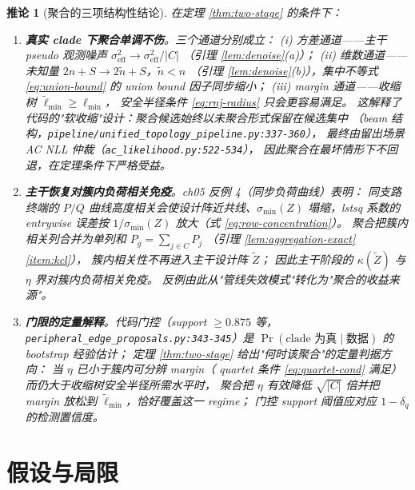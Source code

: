 \documentclass[UTF8,11pt]{ctexart}
\newtheorem{corollary}{推论}
\begin{document}
\begin{corollary}[聚合的三项结构性结论]
\label{cor:main}
在定理 \ref{thm:two-stage} 的条件下：
\begin{enumerate}[label=\textup{(\roman*)},leftmargin=2.6em]
  \item \textbf{真实 clade 下聚合单调不伤}。三个通道分别成立：
        (i) 方差通道——主干 pseudo 观测噪声 $\sigma_{\mathrm{eff}}^2\to\sigma_{\mathrm{eff}}^2/|C|$
        （引理 \ref{lem:denoise}(a)）；
        (ii) 维数通道——未知量 $2n+S\to 2\tilde n+S$，$\tilde n<n$
        （引理 \ref{lem:denoise}(b)），集中不等式 \eqref{eq:union-bound} 的
        union bound 因子同步缩小；
        (iii) margin 通道——收缩树 $\widetilde\ell_{\min}\ge\ell_{\min}$，
        安全半径条件 \eqref{eq:rnj-radius} 只会更容易满足。
        这解释了代码的"软收缩"设计：聚合候选始终以未聚合形式保留在候选集中
        （beam 结构，\texttt{pipeline/unified\_topology\_pipeline.py:337-360}），
        最终由留出场景 AC NLL 仲裁（\texttt{ac\_likelihood.py:522-534}），
        因此聚合在最坏情形下不回退，在定理条件下严格受益。
  \item \textbf{主干恢复对簇内负荷相关免疫}。ch05 反例 4（同步负荷曲线）表明：
        同支路终端的 $P/Q$ 曲线高度相关会使设计阵近共线、$\sigma_{\min}(Z)$
        塌缩，lstsq 系数的 entrywise 误差按
        $1/\sigma_{\min}(Z)$ 放大（式 \eqref{eq:row-concentration}）。
        聚合把簇内相关列合并为单列和 $P_g=\sum_{j\in C}P_j$
        （引理 \ref{lem:aggregation-exact}\ref{item:kcl}），
        簇内相关性不再进入主干设计阵 $\widetilde Z$；
        因此主干阶段的 $\kappa(\widetilde Z)$ 与 $\eta$ 界对簇内负荷相关免疫。
        反例由此从"管线失效模式"转化为"聚合的收益来源"。
  \item \textbf{门限的定量解释}。代码门控（support $\ge 0.875$ 等，
        \texttt{peripheral\_edge\_proposals.py:343-345}）是
        $\Pr(\text{clade 为真}\mid\text{数据})$ 的 bootstrap 经验估计；
        定理 \ref{thm:two-stage} 给出"何时该聚合"的定量判据方向：
        当 $\eta$ 已小于簇内可分辨 margin（ quartet 条件
        \eqref{eq:quartet-cond} 满足）而仍大于收缩树安全半径所需水平时，
        聚合把 $\eta$ 有效降低 $\sqrt{|C|}$ 倍并把 margin 放松到
        $\widetilde\ell_{\min}$，恰好覆盖这一 regime；
        门控 support 阈值应对应 $1-\delta_q$ 的检测置信度。
\end{enumerate}
\end{corollary}

\section{假设与局限}
\label{sec:limitations}
\end{document}
